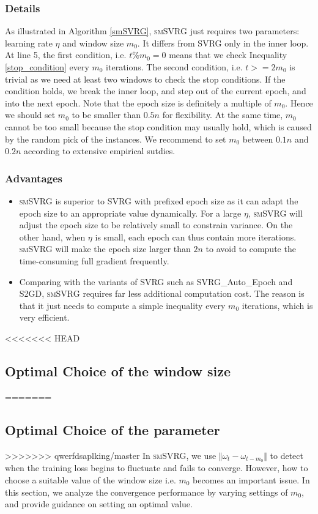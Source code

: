 \documentclass[conference]{IEEEtran}
\begin{document}
 
\subsubsection{Details}
As illustrated in Algorithm \ref{smSVRG}, \textsc{smSVRG} just requires two parameters: learning rate $\eta$ and window size $m_0$. It differs from SVRG only in the inner loop. At line 5, the first condition, i.e. $t\%m_0=0$ means that  we check Inequality \ref{stop_condition} every $m_0$ iterations. The second condition, i.e. $t>=2m_0$ is trivial as we need at least two windows to check the stop conditions.  If the condition holds, we break the inner loop, and step out of the current epoch, and into the next epoch. Note that the epoch size is definitely a multiple of $m_0$. Hence we should set $m_0$ to be smaller than $0.5n$ for flexibility. At the same time, $m_0$ cannot be too small because the stop condition may usually hold, which is caused by the random pick of the instances. We recommend to set $m_0$ between $0.1n$ and $0.2n$ according to extensive empirical sutdies.

\subsubsection{Advantages}
\begin{itemize}
\item \textsc{smSVRG} is superior to SVRG with prefixed epoch size as it can adapt the epoch size to an appropriate value dynamically. For a large $\eta$, \textsc{smSVRG} will adjust the epoch size to be relatively small to constrain variance. On the other hand, when $\eta$ is small, each epoch can thus contain more iterations. \textsc{smSVRG} will make the epoch size larger than $2n$ to avoid to compute the time-consuming full gradient frequently.
\item Comparing with the variants of SVRG such as SVRG\_Auto\_Epoch and S2GD, \textsc{smSVRG} requires far less additional computation cost. The reason is that it just needs to compute a simple inequality every $m_0$ iterations, which is very efficient.
\end{itemize}
 
<<<<<<< HEAD
 \subsection{Optimal Choice of the window size}
=======
 \subsection{Optimal Choice of the parameter}
>>>>>>> qwerfdsaplking/master
 \label{m0_analysis}
 In \textsc{smSVRG}, we use $\Vert\omega_{t}-\omega_{t-m_0}\Vert$ to detect when the training loss begins to fluctuate and fails to converge. However, how to choose a suitable value of the window size i.e. $m_0$ becomes an important issue. In this section, we analyze the convergence performance by varying settings of $m_0$, and provide guidance on setting an optimal value.
 
\end{document}
